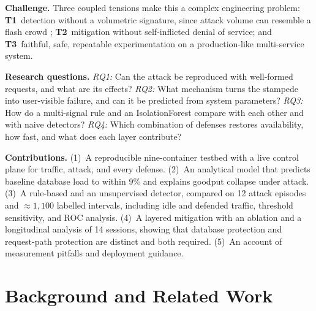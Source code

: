 \documentclass[journal]{IEEEtran}
\begin{document}
\textbf{Challenge.} Three coupled tensions make this a complex engineering problem:
\textbf{T1}~detection without a volumetric signature, since attack volume can resemble
a flash crowd \cite{jung2002,kandula2005}; \textbf{T2}~mitigation without
self-inflicted denial of service; and \textbf{T3}~faithful, safe, repeatable
experimentation on a production-like multi-service system.

\textbf{Research questions.} \emph{RQ1:} Can the attack be reproduced with well-formed
requests, and what are its effects? \emph{RQ2:} What mechanism turns the stampede into
user-visible failure, and can it be predicted from system parameters? \emph{RQ3:} How
do a multi-signal rule and an IsolationForest compare with each other and with naive
detectors? \emph{RQ4:} Which combination of defenses restores availability, how fast,
and what does each layer contribute?

\textbf{Contributions.} (1)~A reproducible nine-container testbed with a live control
plane for traffic, attack, and every defense. (2)~An analytical model that predicts
baseline database load to within 9\% and explains goodput collapse under attack.
(3)~A rule-based and an unsupervised detector, compared on 12 attack episodes and
${\approx}1{,}100$ labelled intervals, including idle and defended traffic, threshold
sensitivity, and ROC analysis. (4)~A layered mitigation with an ablation and a
longitudinal analysis of 14 sessions, showing that database protection and request-path
protection are distinct and both required. (5)~An account of measurement pitfalls and
deployment guidance.

\section{Background and Related Work}
\label{sec:related}
\end{document}
